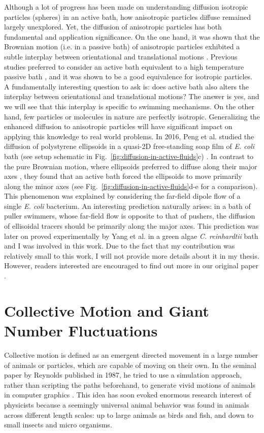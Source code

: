 Although a lot of progress has been made on understanding diffusion isotropic particles (spheres) in an active bath, how anisotropic particles diffuse remained largely unexplored. Yet, the diffusion of anisotropic particles has both fundamental and application significance. On the one hand, it was shown that the Brownian motion (i.e. in a passive bath) of anisotropic particles exhibited a subtle interplay between orientational and translational motions \cite{Han2006}. Previous studies preferred to consider an active bath equivalent to a high temperature passive bath \cite{Wu2000}, and it was shown to be a good equivalence for isotropic particles. A fundamentally interesting question to ask is: does active bath also alters the interplay between orientational and translational motions? The answer is yes, and we will see that this interplay is specific to swimming mechanisms. On the other hand, few particles or molecules in nature are perfectly isotropic. Generalizing the enhanced diffusion to anisotropic particles will have significant impact on applying this knowledge to real world problems. In 2016, Peng et al. studied the diffusion of polystyrene ellipsoids in a quasi-2D free-standing soap film of \textit{E. coli} bath (see setup schematic in Fig.~\ref{fig:diffusion-in-active-fluids}c) \cite{Peng2016}. In contrast to the pure Brownian motion, where ellipsoids preferred to diffuse along their major axes \cite{Han2006}, they found that an active bath forced
the ellipsoids to move primarily along the minor axes (see Fig.~\ref{fig:diffusion-in-active-fluids}d-e for a comparison). This phenomenon was explained by considering the far-field dipole flow of a single \textit{E. coli} bacterium. An interesting prediction naturally arises: in a bath of puller swimmers, whose far-field flow is opposite to that of pushers, the diffusion of ellisoidal tracers should be primarily along the major axes. This prediction was later on proved experimentally by Yang et al. \cite{Yang2016} in a green algae \textit{C. reinhardtii} bath and I was involved in this work. Due to the fact that my contribution was relatively small to this work, I will not provide more details about it in my thesis. However, readers interested are encouraged to find out more in our original paper \cite{Yang2016}.





\section{Collective Motion and Giant Number Fluctuations}
Collective motion is defined as an emergent directed movement in a large number of animals or particles, which are capable of moving on their own. In the seminal paper by Reynolds published in 1987, he tried to use a simulation approach, rather than scripting the paths beforehand, to generate vivid motions of animals in computer graphics \cite{Reynolds1987}. This idea has soon evoked enormous research interest of physicists because a seemingly universal animal behavior was found in animals across different length scales: up to large animals as birds and fish, and down to small insects and micro organisms.


